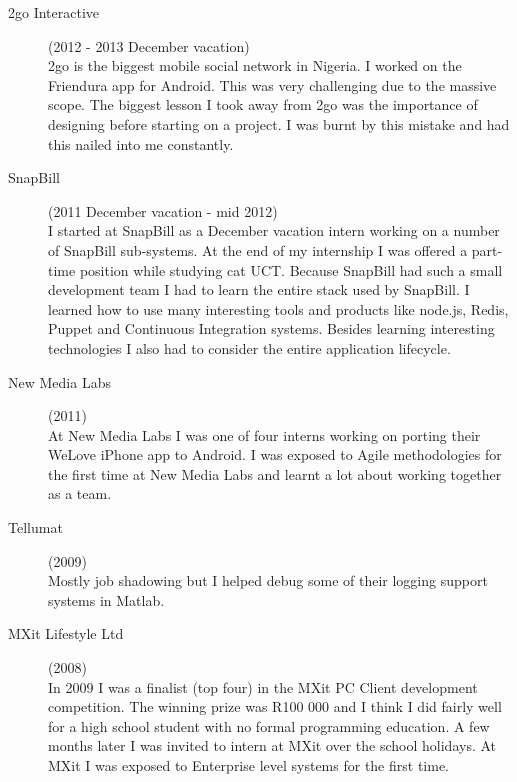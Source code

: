 \documentclass[margin,line,a4paper]{resume}
\begin{document}
\begin{resume}
\begin{description}
                \item[2go Interactive] (2012 - 2013 December vacation) \\
                    2go is the biggest mobile social network in Nigeria. I worked on the Friendura app for Android. 
                    This was very challenging due to the massive scope. The biggest lesson I took away from 
                    2go was the importance of designing before starting on a project. I was burnt by this 
                    mistake and had this nailed into me constantly.

                \item[SnapBill] (2011 December vacation - mid 2012) \\
                    I started at SnapBill as a December vacation intern working on a number of SnapBill 
                    sub-systems. At the end of my internship I was offered a part-time position while studying 
                    cat UCT. Because SnapBill had such a small development team I had to learn the entire stack 
                    used by SnapBill. I learned how to use many interesting tools and products like node.js, 
                    Redis, Puppet and Continuous Integration systems. Besides learning interesting technologies 
                    I also had to consider the entire application lifecycle. 

                \item[New Media Labs] (2011) \\
                    At New Media Labs I was one of four interns working on porting their WeLove iPhone app to Android.
                    I was exposed to Agile methodologies for the first time at New Media Labs and learnt a lot about
                    working together as a team.

                \item[Tellumat] (2009) \\
                    Mostly job shadowing but I helped debug some of their logging support systems
                in Matlab.

                \item[MXit Lifestyle Ltd] (2008) \\
                    In 2009 I was a finalist (top four) in the MXit PC Client development competition. The winning 
                    prize was R100 000 and I think I did fairly well for a high school student with no formal 
                    programming education. A few months later I was invited to intern at MXit over the school 
                    holidays. At MXit I was exposed to Enterprise level systems for the first time.
            \end{description}


\end{resume}
\end{document}
